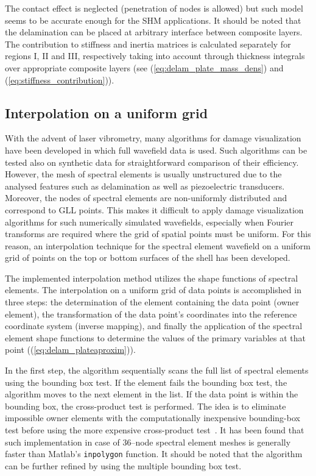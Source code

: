 \documentclass[12pt]{iopart}
\begin{document}
The contact effect is neglected (penetration of nodes is allowed) but such model seems to be accurate enough for the SHM applications. It should be noted that the delamination can be placed at arbitrary interface between composite layers. The contribution to stiffness and inertia matrices is calculated separately for regions I, II and III, respectively taking into account through thickness integrals over appropriate composite layers (see (\ref{eq:delam_plate_mass_dens}) and (\ref{eq:stiffness_contribution})).

\subsection{Interpolation on a uniform grid}

With the advent of laser vibrometry, many algorithms for damage visualization have been developed in which full wavefield data is used. Such algorithms can be tested also on synthetic data for straightforward comparison of their efficiency. However, the mesh of spectral elements is usually unstructured due to the analysed features such as delamination as well as piezoelectric transducers. Moreover, the nodes of spectral elements are non-uniformly distributed and correspond to GLL points. This makes it difficult to apply damage visualization algorithms for such numerically simulated wavefields, especially when Fourier transforms are required where the grid of spatial points must be uniform. For this reason, an interpolation technique for the spectral element wavefield on a uniform grid of points on the top or bottom surfaces of the shell has been developed. 

The implemented interpolation method utilizes the shape functions of spectral elements. The interpolation on a uniform grid of data points is accomplished in three steps: the determination of the element containing the data point (owner element), the transformation of the data point’s coordinates into the reference coordinate system (inverse mapping), and finally the application of the spectral element shape functions to determine the values of the primary variables at that point ((\ref{eq:delam_plateaproxim})).

In the first step, the algorithm sequentially scans the full list of spectral elements using the bounding box test. If the element fails the bounding box test, the algorithm moves to the next element in the list. If the data point is within the bounding box, the cross-product test is performed. The idea is to eliminate impossible owner elements with the computationally inexpensive bounding-box test before using the more expensive cross-product test~\cite{Silva2009}. It has been found that such implementation in case of 36--node spectral element meshes is generally faster than Matlab's \verb|inpolygon| function. It should be noted that the algorithm can be further refined by using the multiple bounding box test.
\end{document}
